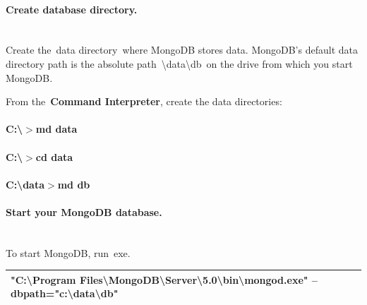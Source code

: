 \documentclass{article}
\begin{document}
\noindent 

\noindent 
\paragraph{Create database directory.}

\noindent \\ Create the~data directory~where MongoDB stores data. MongoDB's default data directory path is the absolute path~{\textbackslash}data{\textbackslash}db~on the drive from which you start MongoDB.

\noindent From the~\textbf{Command Interpreter}, create the data directories:

\noindent 
\paragraph{C:{\textbackslash}$\boldsymbol{\mathrm{>}}$md data}

\noindent 
\paragraph{C:{\textbackslash}$\boldsymbol{\mathrm{>}}$cd data}

\noindent 
\paragraph{C:{\textbackslash}data$\boldsymbol{\mathrm{>}}$md db}

\noindent 

\noindent 
\paragraph{Start your MongoDB database.}

\noindent \\ To start MongoDB, run~exe.

\begin{tabular}{|p{4.3in}|} \hline 
"C:{\textbackslash}Program Files{\textbackslash}MongoDB{\textbackslash}Server{\textbackslash}5.0{\textbackslash}bin{\textbackslash}mongod.exe" --dbpath="c:{\textbackslash}data{\textbackslash}db" \\ \hline 
\end{tabular}



\noindent 

\noindent \\ \textbf{}
\end{document}
